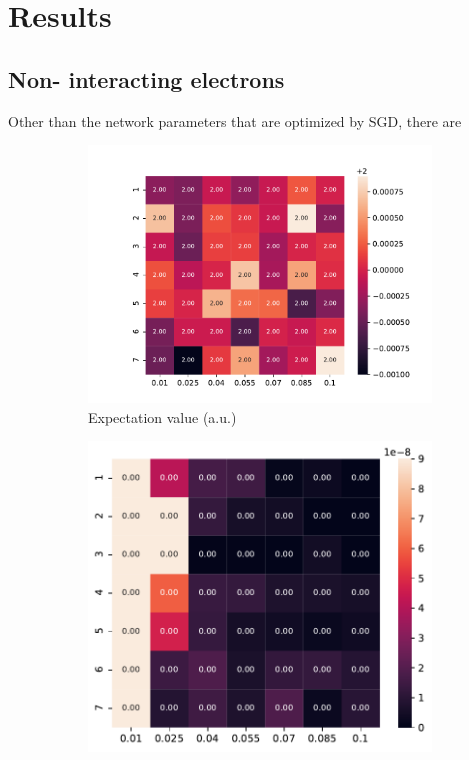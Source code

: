 \documentclass[11pt,a4paper,titlepage]{article}
\begin{document}
\section{Results}
\subsection{Non- interacting electrons}
Other than the network parameters that are optimized by SGD, there are 
\begin{figure}[H]
\begin{subfigure}{.5\textwidth}
\includegraphics[trim=2cm 0.9cm 2cm 0.9cm,scale = 0.6]{exp_val_non_interacting.pdf}
\caption{Expectation value (a.u.)}\label{J1}
\end{subfigure}%
\begin{subfigure}{.5\textwidth}
\includegraphics[trim=0cm 0.3cm 0cm 0.0cm,scale = 0.6]{std_dev_non_interacting.pdf}

\end{subfigure}
\end{figure}
\end{document}
